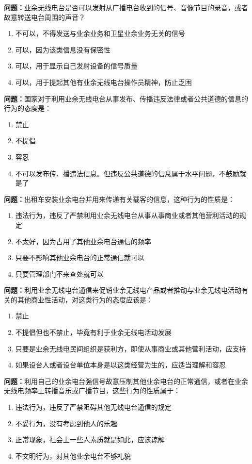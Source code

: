 \textbf{问题：}业余无线电台是否可以发射从广播电台收到的信号、音像节目的录音，或者故意转送电台周围的声音？
\begin{enumerate}[label=\Alph*), leftmargin=1.5cm]
	\item 不可以，不得发送与业余业务和卫星业余业务无关的信号
	\item 可以，因为该类信息没有保密性
	\item 可以，用于显示自己发射设备的信号质量
	\item 可以，用于提起其他有业余无线电台操作员精神，防止乏困
\end{enumerate}

\textbf{问题：}国家对于利用业余无线电台从事发布、传播违反法律或者公共道德的信息的行为的态度是：
\begin{enumerate}[label=\Alph*), leftmargin=1.5cm]
	\item 禁止
	\item 不提倡
	\item 容忍
	\item 不可以发布传、播违法信息。但违反公共道德的信息属于水平问题，不鼓励就是了
\end{enumerate}

\textbf{问题：}出租车安装业余电台并用来传递有关载客的信息，这种行为的性质是：
\begin{enumerate}[label=\Alph*), leftmargin=1.5cm]
	\item 违法行为，违反了严禁利用业余无线电台从事从事商业或者其他营利活动的规定
	\item 不太好，因为占用了其他业余电台通信的频率
	\item 只要不影响其他业余电台的正常通信就可以
	\item 只要管理部门不来查处就可以
\end{enumerate}

\textbf{问题：}利用业余无线电台通信来促销业余无线电产品或者推动与业余无线电活动有关的其他商业性活动，对这类行为的态度应该是：
\begin{enumerate}[label=\Alph*), leftmargin=1.5cm]
	\item 禁止
	\item 不提倡但也不禁止，毕竟有利于业余无线电活动发展
	\item 只要是业余无线电民间组织是获利方，即使从事商业或其他营利活动，应支持
	\item 如果设台人或者设台单位本身是以这类经营为生的，应适当理解和容忍
\end{enumerate}

\textbf{问题：}利用自己的业余电台强信号故意压制其他业余电台的正常通信，或者在业余无线电频率上转播音乐或广播节目，这些行为的性质属于：
\begin{enumerate}[label=\Alph*), leftmargin=1.5cm]
	\item 违法行为，违反了严禁阻碍其他无线电台通信的规定
	\item 不妥行为，没有考虑到他人的乐趣
	\item 正常现象，社会上一些人素质就是如此，应该谅解
	\item 不文明行为，对其他业余电台不够礼貌
\end{enumerate}

